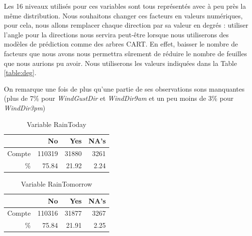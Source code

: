 \documentclass{article}
\begin{document}
Les 16 niveaux utilisés pour ces variables sont tous représentés avec à peu près la même distribution. Nous souhaitons changer ces facteurs en valeurs numériques, pour cela, nous allons remplacer chaque direction par sa valeur en degrés : utiliser l'angle pour la directions nous servira peut-être lorsque nous utiliserons des modèles de prédiction comme des arbres CART. En effet, baisser le nombre de facteurs que nous avons nous permettra sûrement de réduire le nombre de feuilles que nous aurions pu avoir. Nous utiliserons les valeurs indiquées dans la Table \ref{table:deg}.

\begin{table}[H]
    \centering
    \caption{Les 16 points cardinaux en degrés}
    \label{table:deg}
\end{table}

On remarque une fois de plus qu'une partie de ses observations sons manquantes (plus de 7\% pour \emph{WindGustDir} et \emph{WindDir9am} et un peu moins de 3\% pour \emph{WindDir3pm})


\begin{table}[p]
    \centering
    \begin{tabular}{|r||rrr|}
        \hline
        &    No &    Yes &   NA's \\
        \hline
        \hline
        Compte & 110319 &  31880 &   3261 \\
        \% & 75.84 & 21.92 & 2.24 \\
        \hline
    \end{tabular}
    \caption{Variable RainToday}
    \label{table:rain_today}
\end{table}

\begin{table}[p]
    \centering
    \begin{tabular}{|r||rrr|}
        \hline
        &    No &    Yes &   NA's \\
        \hline
        \hline
        Compte & 110316 &  31877 &   3267 \\
        \% & 75.84 & 21.91 & 2.25 \\
        \hline
    \end{tabular}
    \caption{Variable RainTomorrow}
    \label{table:rain_tomorrow}
\end{table}
\end{document}
